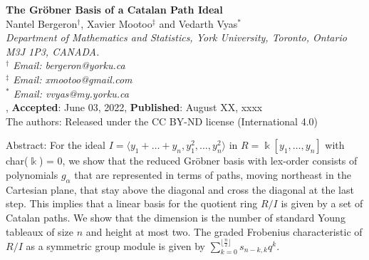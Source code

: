\documentclass[10pt,a4paper]{article}
\def\field{\Bbbk}
\begin{document}
\baselineskip=0.20in

\vskip36pt


\begin{center}
{\large \bf The Gr\"obner Basis of a Catalan Path Ideal}\\[10pt]

Nantel Bergeron$^\dag$, Xavier Mootoo$^\ddag$ and Vedarth Vyas$^*$\\[20pt]

\footnotesize {\it Department of Mathematics and Statistics, York  University, Toronto, Ontario M3J 1P3, CANADA.\\
$^\dag$ Email: bergeron@yorku.ca\\
$^\ddag$ Email: xmootoo@gmail.com\\
$^*$ Email: vvyas@my.yorku.ca}\\[10pt]

,
{\footnotesize {\bf Accepted}: June 03, 2022}, {\footnotesize {\bf Published}: August XX, xxxx}\\

\noindent The authors: Released under the CC BY-ND license (International 4.0)
\end{center}


\setcounter{page}{1} \thispagestyle{empty}

\baselineskip=0.30in

\normalsize

\noindent
{\sc Abstract:} For the ideal $I = \langle y_1 +  \dots + y_n, y^2_1, \dots , y^2_n \rangle$ in $R = \field[y_1, \dots , y_n]$ 
with char($\field$) = 0, we show that the reduced Gr\"obner basis with lex-order consists of polynomials $g_\alpha$ that are
represented in terms of paths, moving northeast in the Cartesian plane, that stay above the diagonal 
and cross the diagonal at the last step.  This implies that a linear basis for the quotient ring $R/I$ is given by a set of Catalan paths. We show that the dimension 
is the number of standard Young tableaux of size $n$ and height at most two. The graded Frobenius characteristic of $R/I$ as a symmetric group module is given by 
$\sum_{k=0}^{\lfloor \frac{n}{2} \rfloor } s_{n-k,k}q^k$.
\end{document}
